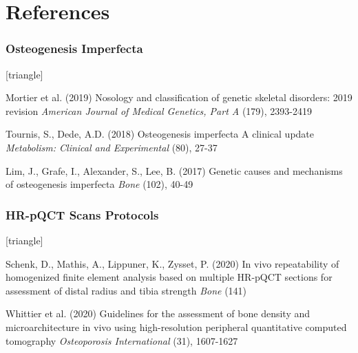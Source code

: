 \documentclass[xcolor=table,11pt]{beamer}
\begin{document}
\section{References}
\begin{frame}
	\frametitle{Osteogenesis Imperfecta}
	\footnotesize{
		\begin{thebibliography}{99}
			[triangle]
			
			 Mortier et al. (2019)
			\newblock Nosology and classification of genetic skeletal disorders: 2019 revision
			\newblock \textit{American Journal of Medical Genetics, Part A} (179), 2393-2419
			
			 Tournis, S., Dede, A.D. (2018)
			\newblock Osteogenesis imperfecta A clinical update
			\newblock \textit{Metabolism: Clinical and Experimental} (80), 27-37
			
			  Lim, J., Grafe, I., Alexander, S., Lee, B. (2017)
			\newblock Genetic causes and mechanisms of osteogenesis imperfecta
			\newblock \textit{Bone} (102), 40-49
			
		\end{thebibliography}
	}
\end{frame}



\begin{frame}
	\frametitle{HR-pQCT Scans Protocols}
	\footnotesize{
		\begin{thebibliography}{99}
			[triangle]
			
			  Schenk, D., Mathis, A., Lippuner, K., Zysset, P. (2020)
			\newblock In vivo repeatability of homogenized finite element analysis based on multiple HR-pQCT sections for assessment of distal radius and tibia	strength
			\newblock \textit{Bone} (141)
			
			 Whittier et al. (2020)
			\newblock Guidelines for the assessment of bone density and microarchitecture in vivo using high-resolution peripheral quantitative computed tomography
			\newblock \textit{Osteoporosis International} (31), 1607-1627
			
		\end{thebibliography}
	}
\end{frame}
\end{document}
